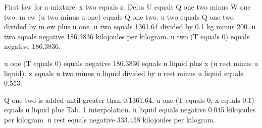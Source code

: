 First law for a mixture.  
x two equals z.  
Delta U equals Q one two minus W one two.  
m ew (u two minus u one) equals Q one two.  
u two equals Q one two divided by m ew plus u one.  
u two equals 1361.64 divided by 0.1 kg minus 200.  
u two equals negative 186.3836 kilojoules per kilogram.  
u two (T equals 0) equals negative 186.3836.  

u one (T equals 0) equals negative 186.3836 equals u liquid plus x (u rest minus u liquid).  
x equals u two minus u liquid divided by u rest minus u liquid equals 0.553.  

Q one two is added until greater than 0.1361.64.  
u one (T equals 0, x equals 0.1) equals u liquid plus Tab. 1 interpolation.  
u liquid equals negative 0.045 kilojoules per kilogram.  
u rest equals negative 333.458 kilojoules per kilogram.
